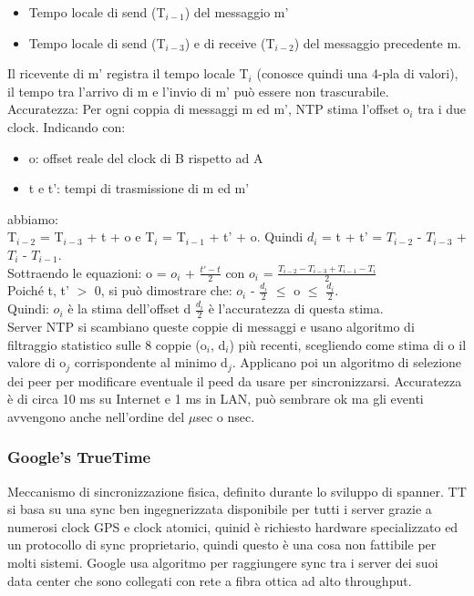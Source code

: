 \documentclass{article}
\begin{document}
\begin{itemize}
\item Tempo locale di send (T$_{i-1}$) del messaggio m'
\item Tempo locale di send (T$_{i-3}$) e di receive (T$_{i-2}$) del messaggio precedente m.
\end{itemize}
Il ricevente di m' registra il tempo locale T$_i$ (conosce quindi una 4-pla di valori), il tempo tra l'arrivo di m e l'invio di m' può essere non trascurabile.\\ Accuratezza: Per ogni coppia di messaggi m ed m', NTP stima l'offset o$_i$ tra i due clock. Indicando con:
\begin{itemize}
\item o: offset reale del clock di B rispetto ad A
\item t e t': tempi di trasmissione di m ed m'
\end{itemize} 
abbiamo:\\ 
T$_{i-2}$ =  T$_{i-3}$ + t + o e T$_i$ = T$_{i-1}$ + t' + o. Quindi $d_i$ = t + t' = $T_{i-2}$ - $T_{i-3}$ + $T_i$ - $T_{i-1}$.\\ Sottraendo le equazioni: o = $o_i$ + $\frac{t'-t}{2}$ con $o_i$ = $\frac{T_{i-2} - T_{i-3} + T_{i-1} - T_i}{2}$\\ Poiché t, t' $>$ 0, si può dimostrare che: $o_i$ - $\frac{d_i}{2}$ $\leq$ o $\leq$ $\frac{d_i}{2}$.\\ Quindi: $o_i$ è la stima dell'offset d $\frac{d_i}{2}$ è l'accuratezza di questa stima.\\ Server NTP si scambiano queste coppie di messaggi e usano algoritmo di filtraggio statistico sulle 8 coppie (o$_i$, d$_i$) più recenti, scegliendo come stima di o il valore di o$_j$ corrispondente al minimo d$_j$. Applicano poi un algoritmo di selezione dei peer per modificare eventuale il peed da usare per sincronizzarsi. Accuratezza è di circa 10 ms su Internet e 1 ms in LAN, può sembrare ok ma gli eventi avvengono anche nell'ordine del $\mu$sec o nsec.
\subsubsection{Google's TrueTime}
Meccanismo di sincronizzazione fisica, definito durante lo sviluppo di spanner. TT si basa su una sync ben ingegnerizzata disponibile per tutti i server grazie a numerosi clock GPS e clock atomici, quinid è richiesto hardware specializzato ed un protocollo di sync proprietario, quindi questo è una cosa non fattibile per molti sistemi. Google usa algoritmo per raggiungere sync tra i server dei suoi data center che sono collegati con rete a fibra ottica ad alto throughput.
\end{document}
